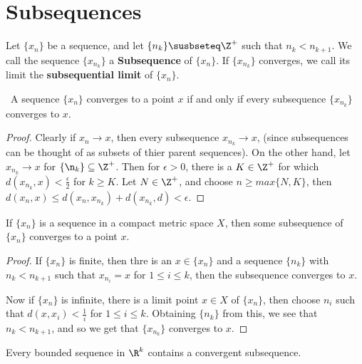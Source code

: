 
\section{Subsequences}

\begin{definition}
    Let $\{x_n\}$ be a sequence, and let  $\{n_k\} \susbseteq \Z^+$ such that 
    $n_k<n_{k+1}$. We call the sequence $\{x_{n_k}\}$ a \textbf{Subsequence} of $\{x_n\}$. If 
    $\{x_{n_k}\}$ converges, we call its limit the \textbf{subsequential limit} of $\{x_n\}$.
\end{definition}

\begin{theorem}\label{3.2.1}\
    A sequence $\{x_n\}$ converges to a point  $x$ if  and only if every subsequence  
    $\{x_{n_k}\}$ converges to $x$.
\end{theorem}
\begin{proof}
    Clearly if $x_n \rightarrow x$, then every subsequence  $x_{n_k} \rightarrow x$, (since subsequences 
    can be thought of as subsets of thier parent sequences). On the other hand, let 
    $x_{n_k} \rightarrow x$ for $\{\n_k\} \subseteq \Z^+$. Then for  $\epsilon>0$, there is a 
    $K \in \Z^+$ for which  $d(x_{n_k},x)<\frac{\epsilon}{2}$ for $k \geq K$. Let $N \in \Z^+$, and 
    choose  $n \geq max\{N,K\}$, then  $d(x_n,x) \leq d(x_n,x_{n_k})+d(x_{n_k},d)<\epsilon$.
\end{proof}

\begin{theorem}\label{3.2.2}
    If $\{x_n\}$ is a sequence in a compact metric space  $X$, then some subsequence of 
    $\{x_n\}$ converges to a point  $x$.
\end{theorem}
\begin{proof}
    If $\{x_n\}$ is finite, then thre is an  $x \in \{x_n\}$ and a sequence  $\{n_k\}$ with 
    $n_k<n_{k+1}$ such that  $x_{n_i}=x$ for  $1 \leq i \leq k$, then the subsequence converges 
    to  $x$.

    Now if  $\{x_n\}$ is infinite, there is a limit point  $x \in X$ of $\{x_n\}$, then 
    choose  $n_i$ such that  $d(x,x_i)<\frac{1}{i}$ for $1 \leq i \leq k$. Obtaining  $\{n_k\}$ 
    from this, we see that  $n_k<n_{k+1}$, and so we get that  $\{x_{n_k}\}$ converges to  $x$.
\end{proof}
\begin{corollary}
    Every bounded sequence in $\R^k$ contains a convergent subsequence.
\end{corollary}


